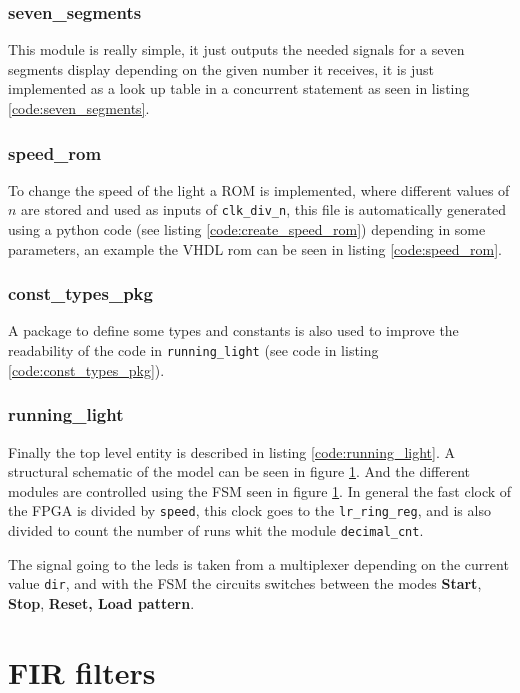 \documentclass[12pt]{article}   	%
\begin{document}
\subsubsection{seven\_segments}
This module is really simple, it just outputs the needed signals for a seven segments display depending on the given number it receives, it is just implemented as a look up table in a concurrent statement as seen in listing \ref{code:seven_segments}.


\subsubsection{speed\_rom}
To change the speed of the light a ROM is implemented, where different values of $n$ are stored and used as inputs of \lstinline{clk_div_n}, this file is automatically generated using a python code (see listing \ref{code:create_speed_rom}) depending in some parameters, an example the VHDL rom can be seen in listing \ref{code:speed_rom}.

\subsubsection{const\_types\_pkg}
A package to define some types and constants is also used to improve the readability of the code in \lstinline{running_light} (see code in listing \ref{code:const_types_pkg}).

\subsubsection{running\_light}

Finally the top level entity is described in listing \ref{code:running_light}. A structural schematic of the model can be seen in figure \ref{}. And the different modules are controlled using the FSM seen in figure \ref{}. In general the fast clock of the FPGA is divided by \lstinline{speed}, this clock goes to the \lstinline{lr_ring_reg}, and is also divided to count the number of runs whit the module \lstinline{decimal_cnt}.

The signal going to the leds is taken from a multiplexer depending on the current value \lstinline{dir}, and with the FSM the circuits switches between the modes \textbf{Start}, \textbf{Stop}, \textbf{Reset, Load pattern}.




\section{FIR filters}
\end{document}
